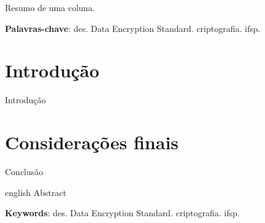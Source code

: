 \documentclass[
	article,			%
	12pt,				%
	oneside,			%
	a4paper,			%
	english,			%
	brazil,				%
	sumario=tradicional
	]{abntex2}
\begin{document}

\frenchspacing

\maketitle

\begin{resumoumacoluna}
 Resumo de uma coluna.
 
 \vspace{\onelineskip}
 
 \noindent
 \textbf{Palavras-chave}: des. Data Encryption Standard. criptografia. ifsp.
\end{resumoumacoluna}

\textual

\section*{Introdução}

Introdução


\section*{Considerações finais}

Conclusão


\postextual


\emptythanks
\maketitle

\renewcommand{\resumoname}{Abstract}
\begin{resumoumacoluna}
 \begin{otherlanguage*}{english}
   Abstract

   \vspace{\onelineskip}
 
   \noindent
   \textbf{Keywords}: des. Data Encryption Standard. criptografia. ifsp.
 \end{otherlanguage*}  
\end{resumoumacoluna}


\end{document}
